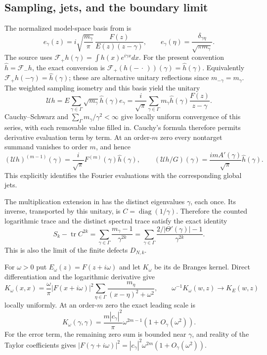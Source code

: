 \subsection{Sampling, jets, and the boundary limit}
The normalized model-space basis from
\cite[Proposition~4.1]{suzuki-weil2025} is
\[
 e_\gamma(z)=i\sqrt{\frac{m_\gamma}{\pi}}\,
                  \frac{F(z)}{E(z)(z-\gamma)},\qquad
 e_\gamma(\eta)=\frac{\delta_{\gamma\eta}}{\sqrt{\pi m_\gamma}}.
\]
The source uses $\mathcal F_+h(\gamma)=\int h(x)e^{i\gamma x}dx$.
For the present convention $\widehat h=\mathcal F_-h$, the exact
conversion is $\mathcal F_+(h(-\,\cdot\,))(\gamma)=\widehat h(\gamma)$.
Equivalently $\mathcal F_+h(-\gamma)=\widehat h(\gamma)$;
these are alternative unitary reflections since
$m_{-\gamma}=m_\gamma$.
The weighted sampling isometry and this basis yield the unitary
\[
 \mathcal Uh
 =E\sum_{\gamma\in\Gamma}\sqrt{m_\gamma}\widehat h(\gamma)e_\gamma
 =\frac{i}{\sqrt\pi}\sum_{\gamma\in\Gamma}
                m_\gamma\widehat h(\gamma)\frac{F(z)}{z-\gamma}.
\]
Cauchy--Schwarz and $\sum_\Gamma m_\gamma/\gamma^2<\infty$
give locally uniform convergence of this series, with each removable
value filled in. Cauchy's formula therefore permits derivative
evaluation term by term. At an order-$m$ zero every nontarget
summand vanishes to order $m$, and hence
\begin{equation}\label{eq:hb-evaluation-jet}
 (\mathcal Uh)^{(m-1)}(\gamma)
       =\frac{i}{\sqrt\pi}F^{(m)}(\gamma)\widehat h(\gamma),
 \qquad
 (\mathcal Uh/G)(\gamma)
       =\frac{imA'(\gamma)}{\sqrt\pi}\widehat h(\gamma).
\end{equation}
This explicitly identifies the Fourier evaluations with
the corresponding global jets.

The multiplication extension in
\cite[Section~6, p.~18]{suzuki-weil2025} has the distinct
eigenvalues $\gamma$, each once. Its inverse, transported by
this unitary, is $C=\operatorname{diag}(1/\gamma)$. Therefore
the counted logarithmic trace and the distinct spectral
trace satisfy the exact identity
\[
 S_k-\operatorname{tr}C^{2k}
   =\sum_{\gamma\in\Gamma}\frac{m_\gamma-1}{\gamma^{2k}}
   =\sum_{\gamma\in\Gamma}
           \frac{2/|\Theta'(\gamma)|-1}{\gamma^{2k}}.
\]
This is also the limit of the finite defects $D_{N,k}$.

For $\omega>0$ put $E_\omega(z)=F(z+i\omega)$ and let
$K_\omega$ be its de Branges kernel. Direct differentiation
and the logarithmic derivative give
\[
 K_\omega(x,x)=\frac{\omega}{\pi}|F(x+i\omega)|^2
  \sum_{\eta\in\Gamma}\frac{m_\eta}{(x-\eta)^2+\omega^2},
 \qquad \omega^{-1}K_\omega(w,z)\longrightarrow K_E(w,z)
\]
locally uniformly. At an order-$m$ zero the exact leading
scale is
\begin{equation}\label{eq:hb-shift-scale}
 K_\omega(\gamma,\gamma)
   =\frac{m|c_\gamma|^2}{\pi}\omega^{2m-1}
                           (1+O_\gamma(\omega^2)).
\end{equation}
For the error term, the remaining zero sum is bounded near
$\gamma$, and reality of the Taylor coefficients gives
$|F(\gamma+i\omega)|^2
=|c_\gamma|^2\omega^{2m}(1+O_\gamma(\omega^2))$.

